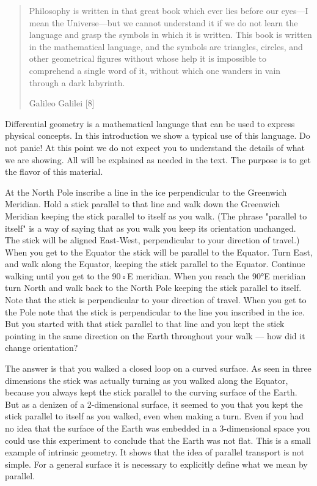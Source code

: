 \documentclass[11pt]{article}
\begin{document}
\begin{quote}
Philosophy is written in that great book which ever lies before our eyes—I mean
the Universe—but we cannot understand it if we do not learn the language and
grasp the symbols in which it is written. This book is written in the
mathematical language, and the symbols are triangles, circles, and other
geometrical figures without whose help it is impossible to comprehend a single
word of it, without which one wanders in vain through a dark labyrinth.

Galileo Galilei [8]
\end{quote}

Differential geometry is a mathematical language that can be used to express
physical concepts. In this introduction we show a typical use of this language.
Do not panic! At this point we do not expect you to understand the details of
what we are showing. All will be explained as needed in the text. The purpose is
to get the flavor of this material.

At the North Pole inscribe a line in the ice perpendicular to the Greenwich
Meridian. Hold a stick parallel to that line and walk down the Greenwich
Meridian keeping the stick parallel to itself as you walk. (The phrase "parallel
to itself" is a way of saying that as you walk you keep its orientation
unchanged. The stick will be aligned East-West, perpendicular to your direction
of travel.) When you get to the Equator the stick will be parallel to the
Equator. Turn East, and walk along the Equator, keeping the stick parallel to
the Equator. Continue walking until you get to the 90◦E meridian. When you reach
the 90°E meridian turn North and walk back to the North Pole keeping the stick
parallel to itself. Note that the stick is perpendicular to your direction of
travel. When you get to the Pole note that the stick is perpendicular to the
line you inscribed in the ice. But you started with that stick parallel to that
line and you kept the stick pointing in the same direction on the Earth
throughout your walk --- how did it change orientation?

The answer is that you walked a closed loop on a curved surface. As seen in
three dimensions the stick was actually turning as you walked along the Equator,
because you always kept the stick parallel to the curving surface of the Earth.
But as a denizen of a 2-dimensional surface, it seemed to you that you kept the
stick parallel to itself as you walked, even when making a turn. Even if you had
no idea that the surface of the Earth was embedded in a 3-dimensional space you
could use this experiment to conclude that the Earth was not flat. This is a
small example of intrinsic geometry. It shows that the idea of parallel
transport is not simple. For a general surface it is necessary to explicitly
define what we mean by parallel.
\end{document}
